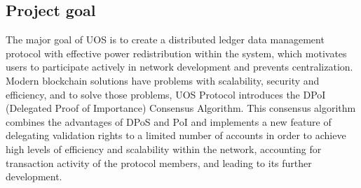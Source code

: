 \documentclass[a4paper,12pt]{article}
\begin{document}

\subsection{Project goal}

The major goal of UOS is to create a distributed ledger data management protocol with effective power redistribution within the system, which motivates users to participate actively in network development and prevents centralization. Modern blockchain solutions have problems with scalability, security and efficiency, and to solve those problems, UOS Protocol introduces the DPoI (Delegated Proof of Importance) Consensus Algorithm. This consensus algorithm combines the advantages of DPoS and PoI and implements a new feature of delegating validation rights to a limited number of accounts in order to achieve high levels of efficiency and scalability within the network, accounting for transaction activity of the protocol members, and leading to its further development.
\end{document}
